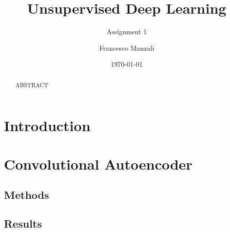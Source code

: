 \documentclass[11pt,a4paper]{scrartcl}
\newcommand{\exerciseNumber}{1}
\begin{document}
\title{Unsupervised Deep Learning}
\subtitle{Assignment \exerciseNumber}
\author{\large Francesco Manzali}
\date{\large \today}
\maketitle
\thispagestyle{fancy}

\begin{abstract}
  ABSTRACT
\end{abstract}



\section*{Introduction}



\section{Convolutional Autoencoder}

\subsection{Methods}



\subsection{Results}






\end{document}
